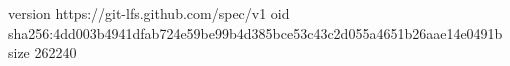version https://git-lfs.github.com/spec/v1
oid sha256:4dd003b4941dfab724e59be99b4d385bce53c43c2d055a4651b26aae14e0491b
size 262240

